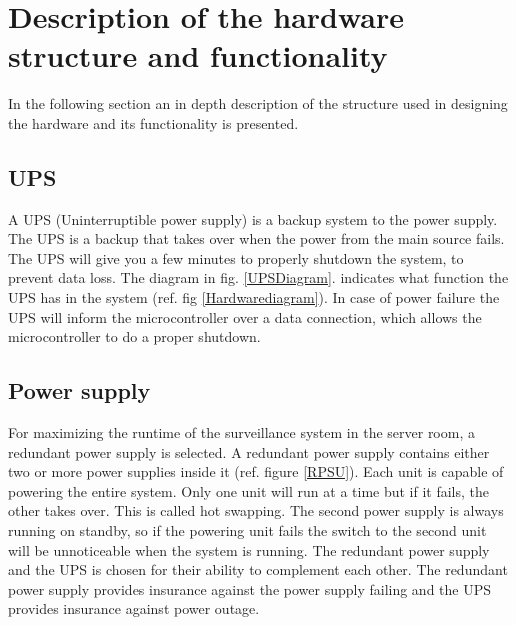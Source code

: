 \section{Description of the hardware structure and functionality}
In the following section an in depth description of the structure used in designing the hardware and its functionality is presented.

\subsection{UPS}
A UPS (Uninterruptible power supply) is a backup system to the power supply. The UPS is a backup that takes over when the power from the main source fails. The UPS will give you a few minutes to properly shutdown the system, to prevent data loss.
\newline
The diagram in fig. \ref{UPSDiagram}.  indicates what function the UPS has in the system (ref. fig \ref{Hardwarediagram}). In case of power failure the UPS will inform the microcontroller over a data connection, which allows the microcontroller to do a proper shutdown.

\subsection{Power supply}
For maximizing the runtime of the surveillance system in the server room, a redundant power supply is selected. 
A redundant power supply contains either two or more  power supplies inside it (ref. figure \ref{RPSU}). Each unit is capable of powering the entire system. Only one unit will run at a time but if it fails, the other takes over. This is called hot swapping. The second power supply is always running on standby, so if the powering unit fails the switch to the second unit will be unnoticeable when the system is running.
\newline
The redundant power supply and the UPS is chosen for their ability to complement each other. The redundant power supply provides insurance against the power supply failing and the UPS provides insurance against power outage.\newline

